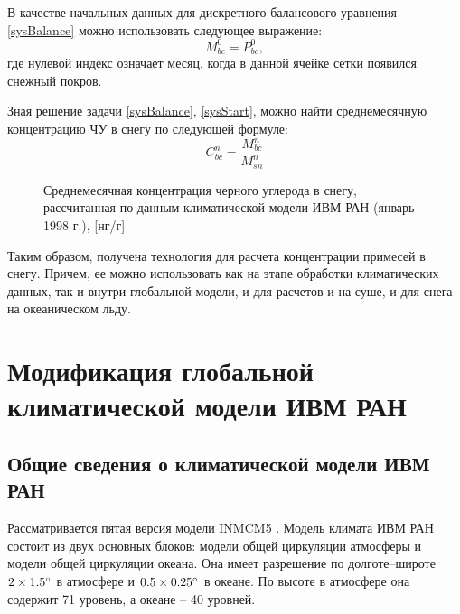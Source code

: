 \documentclass[a4paper, fontsize=14pt]{scrartcl}
\begin{document}
В качестве начальных данных для дискретного балансового уравнения \eqref{sysBalance} можно использовать следующее выражение:
\begin{equation}
    M_{bc}^0 = P_{bc}^0, \label{sysStart}
\end{equation}
где нулевой индекс означает месяц, когда в данной ячейке сетки появился снежный покров. 

Зная решение задачи \eqref{sysBalance}, \eqref{sysStart}, можно найти среднемесячную концентрацию ЧУ в снегу по следующей формуле:
\begin{equation}
   C_{bc}^n = \dfrac{M_{bc}^n}{M_{sn}^n}  \label{sys}
\end{equation}

\begin{figure}[h]
    \caption{Среднемесячная концентрация черного углерода в снегу, рассчитанная по данным климатической модели ИВМ РАН (январь 1998 г.), [нг/г]}
    \label{fig:image}
\end{figure}

Таким образом, получена технология для расчета концентрации примесей в снегу. Причем, ее можно использовать как на этапе обработки климатических данных, так и внутри глобальной модели, и для расчетов и на суше, и для снега на океаническом льду.

\newpage
\section{Модификация глобальной климатической модели ИВМ РАН}

\subsection{Общие сведения о климатической модели ИВМ РАН}

Рассматривается пятая версия модели INMCM5 \cite{Volodin2017}. Модель климата ИВМ РАН состоит из двух основных блоков: модели общей циркуляции атмосферы и модели общей циркуляции океана. Она имеет разрешение по долготе--широте $2 \times 1.5\degree$ в атмосфере и $0.5 \times 0.25\degree$ в океане. По высоте в атмосфере она содержит 71 уровень, а океане -- 40 уровней. 
\end{document}
